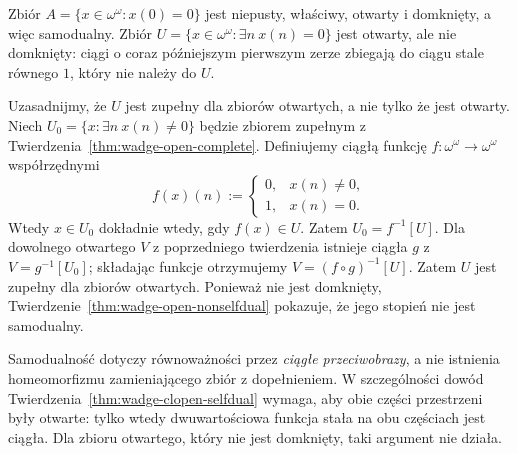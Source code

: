 \begin{przyklad}
Zbiór
$A=\{x\in\omega^\omega:x(0)=0\}$
jest niepusty, właściwy, otwarty i domknięty,
a więc samodualny.
Zbiór
$U=\{x\in\omega^\omega:\exists n\ x(n)=0\}$
jest otwarty, ale nie domknięty:
ciągi o coraz późniejszym pierwszym
zerze zbiegają do ciągu stale równego $1$,
który nie należy do $U$.

Uzasadnijmy, że $U$ jest zupełny
dla zbiorów otwartych, a nie tylko
że jest otwarty.
Niech $U_0=\{x:\exists n\ x(n)\ne0\}$
będzie zbiorem zupełnym
z Twierdzenia~\ref{thm:wadge-open-complete}.
Definiujemy ciągłą funkcję
$f:\omega^\omega\to\omega^\omega$
współrzędnymi
\[
f(x)(n):=
\begin{cases}
0,&x(n)\ne0,\\
1,&x(n)=0.
\end{cases}
\]
Wtedy $x\in U_0$ dokładnie wtedy,
gdy $f(x)\in U$.
Zatem $U_0=f^{-1}[U]$.
Dla dowolnego otwartego $V$
z poprzedniego twierdzenia istnieje
ciągła $g$ z $V=g^{-1}[U_0]$;
składając funkcje otrzymujemy
$V=(f\circ g)^{-1}[U]$.
Zatem $U$ jest zupełny
dla zbiorów otwartych.
Ponieważ nie jest domknięty,
Twierdzenie~\ref{thm:wadge-open-nonselfdual}
pokazuje, że jego stopień
nie jest samodualny.
\end{przyklad}


\begin{uwaga}
\label{rem:wadge-selfdual-audit-32}
Samodualność dotyczy równoważności przez \emph{ciągłe przeciwobrazy}, a nie istnienia homeomorfizmu zamieniającego zbiór z dopełnieniem. W szczególności dowód Twierdzenia~\ref{thm:wadge-clopen-selfdual} wymaga, aby obie części przestrzeni były otwarte: tylko wtedy dwuwartościowa funkcja stała na obu częściach jest ciągła. Dla zbioru otwartego, który nie jest domknięty, taki argument nie działa.
\end{uwaga}
